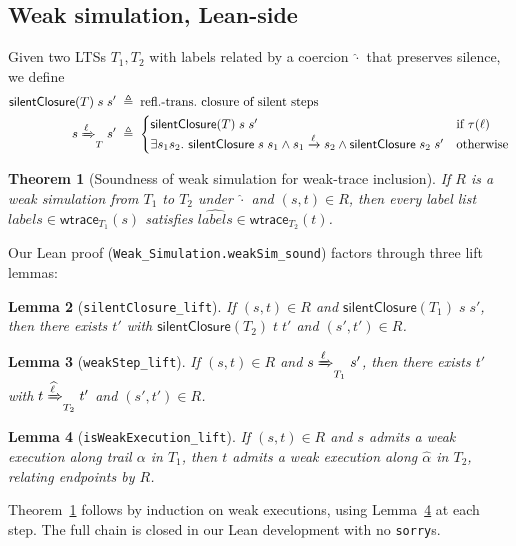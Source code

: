 \documentclass[11pt,a4paper]{article}
\newtheorem{theorem}{Theorem}[section]
\newtheorem{lemma}[theorem]{Lemma}
\theoremstyle{definition}
\theoremstyle{remark}
\newcommand{\wtrace}{\mathsf{wtrace}}
\newcommand{\sorry}{\texttt{sorry}}
\begin{document}
\subsection{Weak simulation, Lean-side}
\label{sec:weaksim}

Given two LTSs $T_1, T_2$ with labels related by a coercion
$\widehat{\cdot}$ that preserves silence, we define
\begin{align*}
  \mathsf{silentClosure}(T)\;s\;s' &\;\triangleq\; \text{refl.-trans.\ closure of silent steps}\\
  s \xRightarrow{\ell}_T s' &\;\triangleq\; \begin{cases}
    \mathsf{silentClosure}(T)\;s\;s' & \text{if } \tau(\ell)\\
    \exists s_1 s_2.\ \mathsf{silentClosure}\;s\;s_1 \wedge s_1 \xrightarrow{\ell} s_2 \wedge \mathsf{silentClosure}\;s_2\;s' & \text{otherwise}
  \end{cases}
\end{align*}

\begin{theorem}[Soundness of weak simulation for weak-trace inclusion]
\label{thm:weaksim-sound}
If $R$ is a weak simulation from $T_1$ to $T_2$ under
$\widehat{\cdot}$ and $(s, t) \in R$, then every label list
$\mathit{labels} \in \wtrace_{T_1}(s)$ satisfies
$\widehat{\mathit{labels}} \in \wtrace_{T_2}(t)$.
\end{theorem}

Our Lean proof (\texttt{Weak\_Simulation.weakSim\_sound}) factors
through three lift lemmas:
\begin{lemma}[\texttt{silentClosure\_lift}]
\label{lem:silent-lift}
If $(s, t) \in R$ and $\mathsf{silentClosure}(T_1)\;s\;s'$, then
there exists $t'$ with $\mathsf{silentClosure}(T_2)\;t\;t'$ and
$(s', t') \in R$.
\end{lemma}
\begin{lemma}[\texttt{weakStep\_lift}]
\label{lem:weakstep-lift}
If $(s, t) \in R$ and $s \xRightarrow{\ell}_{T_1} s'$, then there
exists $t'$ with $t \xRightarrow{\widehat{\ell}}_{T_2} t'$ and
$(s', t') \in R$.
\end{lemma}
\begin{lemma}[\texttt{isWeakExecution\_lift}]
\label{lem:weakexec-lift}
If $(s, t) \in R$ and $s$ admits a weak execution along trail
$\alpha$ in $T_1$, then $t$ admits a weak execution along
$\widehat{\alpha}$ in $T_2$, relating endpoints by $R$.
\end{lemma}

Theorem~\ref{thm:weaksim-sound} follows by induction on weak
executions, using Lemma~\ref{lem:weakexec-lift} at each step. The
full chain is closed in our Lean development with no \sorry{}s.
\end{document}

